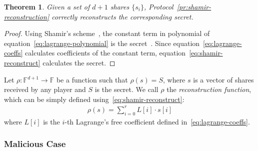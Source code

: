 \documentclass[11pt]{article}
\newtheorem{theorem}{Theorem}
\theoremstyle{plain}
\begin{document}
\begin{theorem}
	Given a set of $d+1$ shares $\{s_{i}\}$, Protocol~\ref{pr:shamir-reconstruction}
	correctly reconstructs the corresponding secret. 
\end{theorem}
\begin{proof}
	Using Shamir's scheme~\cite{shamir:how}, the constant term in polynomial
	of equation~\eqref{eq:lagrange-polynomial} is the secret~\cite{Huang:2010:URL}.
	Since equation~\eqref{eq:lagrange-coeffs} calculates coefficients
	of the constant term, equation~\eqref{eq:shamir-reconstruct} calculates
	the secret. 
\end{proof}
Let $\rho:\mathbb{F}{}^{d+1}\to\mathbb{F}$ be a function such that
$\rho(s)=S$, where $s$ is a vector of shares received by any player
and $S$ is the secret. We call $\rho$ the \emph{reconstruction function},
which can be simply defined using~\eqref{eq:shamir-reconstruct}:
\begin{align}
\rho(s)=\sum_{i=0}^{r}L[i]\cdot s[i]
\end{align}
where $L[i]$ is the $i$-th Lagrange's free coefficient defined in~\eqref{eq:lagrange-coeffs}.



\subsubsection{Malicious Case}
\end{document}
